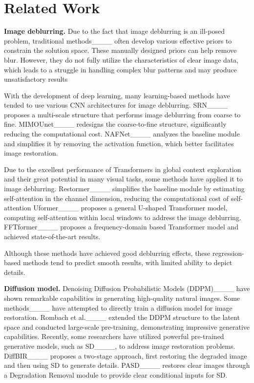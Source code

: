\section{Related Work}
\label{Related Work}
{\flushleft \textbf{Image deblurring.}}
%
Due to the fact that image deblurring is an ill-posed problem, traditional methods____ often develop various effective priors to constrain the solution space.
%
These manually designed priors can help remove blur. 
%
However, they do not fully utilize the characteristics of clear image data, which leads to a struggle in handling complex blur patterns and may produce unsatisfactory results
%

%
With the development of deep learning, many learning-based methods have tended to use various CNN architectures for image deblurring. 
%
SRN____ proposes a multi-scale structure that performs image deblurring from coarse to fine.
%
MIMOUnet____ redesigns the coarse-to-fine structure, significantly reducing the computational cost.
%
NAFNet____ analyzes the baseline module and simplifies it by removing the activation function, which better facilitates image restoration.
%

%
Due to the excellent performance of Transformers in global context exploration and their great potential in many visual tasks, some methods have applied it to image deblurring.
%
Restormer____ simplifies the baseline module by estimating self-attention in the channel dimension, reducing the computational cost of self-attention
%
Uformer____ proposes a general U-shaped Transformer model, computing self-attention within local windows to address the image deblurring.
%
FFTformer____ proposes a frequency-domain based Transformer model and achieved state-of-the-art results.
%

%
Although these methods have achieved good deblurring effects, these regression-based methods tend to predict smooth results, with limited ability to depict details.
%


{\flushleft \textbf{Diffusion model.}}
%
Denoising Diffusion Probabilistic Models (DDPM)____ have shown remarkable capabilities in generating high-quality natural images.
%
Some methods____ have attempted to directly train a diffusion model for image restoration.
%
Rombach et al.____ extended the DDPM structure to the latent space and conducted large-scale pre-training, demonstrating impressive generative capabilities.
%
Recently, some researchers have utilized powerful pre-trained generative models, such as SD____, to address image restoration problems.
%
DiffBIR____ proposes a two-stage approach, first restoring the degraded image and then using SD to generate details.
%
PASD____ restores clear images through a Degradation Removal module to provide clear conditional inputs for SD.
%

